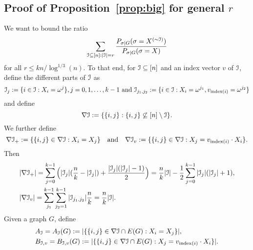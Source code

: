 \documentclass{article}
\begin{document}
\subsection{Proof of Proposition~\ref{prop:big} for general $r$} \label{sect:gen}
We want to bound the ratio
$$
\sum_{\mathcal{I}\subseteq[n]:|\mathcal{I}|=r}
\frac{P_{\sigma|G}(\sigma=X^{(\sim\mathcal{I})})}{P_{\sigma|G}(\sigma=X)}
$$
for all $r\le kn/\log^{1/3}(n)$.
To that end,
for $\mathcal{I}\subseteq[n]$ and an index vector $v$ of $\mathcal{I}$,
define the different parts of $\mathcal{I}$ as
$$
\mathcal{I}_j:=\{i\in\mathcal{I}:X_i= \omega^j\}, j=0, 1, \dots, k-1 \text{ and } \mathcal{I}_{j_1,j_2}:=\{i\in\mathcal{I}:X_i= \omega^{j_1}, v_{\mathrm{index}(i)} = \omega^{j_2}\}
$$
and define 
$$
\nabla \mathcal{I}:=\{\{i,j\}: \{i,j\} \not\subseteq [n]\setminus\mathcal{I}\} .
$$
We further define
$$
\nabla\mathcal{I}_+:=\{\{i,j\}\in\nabla\mathcal{I}:X_i=X_j\}
\quad \text{and} \quad
\nabla\mathcal{I}_v:=\{\{i,j\}\in\nabla\mathcal{I}:X_j= v_{\mathrm{index}(i)} \cdot X_i\}.
$$
Then 
\begin{equation} \label{eq:partial}
\begin{aligned}
& |\nabla\mathcal{I}_+|=\sum_{j=0}^{k-1}\Big(|\mathcal{I}_j|(\frac{n}{k}-|\mathcal{I}_j|) + \frac{|\mathcal{I}_j| (|\mathcal{I}_j|-1)}{2}\Big)
=\frac{n}{k}|\mathcal{I}|- \frac{1}{2}\sum_{j=0}^{k-1}|\mathcal{I}_j|(|\mathcal{I}_j|+1) , \\
& |\nabla\mathcal{I}_v|=\sum_{j_1}^{k-1}\sum_{j_2=1}^{k-1}|\mathcal{I}_{j_1, j_2}|\frac{n}{k} =\frac{n}{k}|\mathcal{I}|
.
\end{aligned}
\end{equation}
Given a graph $G$,
define
\begin{align*}
& A_{\mathcal{I}}=A_{\mathcal{I}}(G):=|\{\{i,j\}\in\nabla\mathcal{I}\cap E(G):X_i=X_j\}| ,  \\
& B_{\mathcal{I},v}=B_{\mathcal{I},v}(G):=|\{\{i,j\}\in\nabla\mathcal{I}\cap E(G):X_j= v_{\mathrm{index}(i)} \cdot X_i\}| .
\end{align*}
\end{document}
